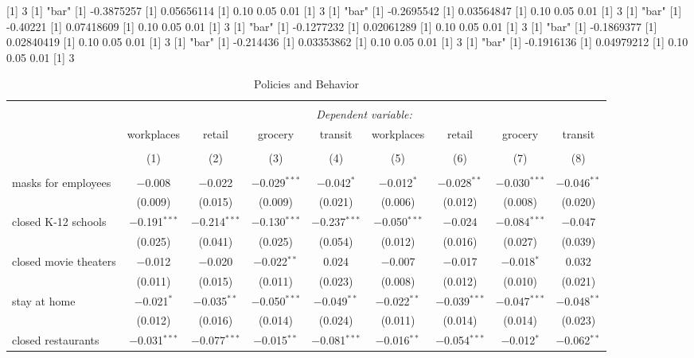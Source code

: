 [1] 3
[1] "bar"
[1] -0.3875257
[1] 0.05656114
[1] 0.10 0.05 0.01
[1] 3
[1] "bar"
[1] -0.2695542
[1] 0.03564847
[1] 0.10 0.05 0.01
[1] 3
[1] "bar"
[1] -0.40221
[1] 0.07418609
[1] 0.10 0.05 0.01
[1] 3
[1] "bar"
[1] -0.1277232
[1] 0.02061289
[1] 0.10 0.05 0.01
[1] 3
[1] "bar"
[1] -0.1869377
[1] 0.02840419
[1] 0.10 0.05 0.01
[1] 3
[1] "bar"
[1] -0.214436
[1] 0.03353862
[1] 0.10 0.05 0.01
[1] 3
[1] "bar"
[1] -0.1916136
[1] 0.04979212
[1] 0.10 0.05 0.01
[1] 3

\begin{table}[!htbp] \centering 
  \caption{Policies and Behavior} 
  \label{} 
\begin{tabular}{@{\extracolsep{1pt}}lcccccccc} 
\\[-1.8ex]\hline 
\hline \\[-1.8ex] 
 & \multicolumn{8}{c}{\textit{Dependent variable:}} \\ 
\cline{2-9} 
 & workplaces & retail & grocery & transit & workplaces & retail & grocery & transit \\ 
\\[-1.8ex] & (1) & (2) & (3) & (4) & (5) & (6) & (7) & (8)\\ 
\hline \\[-1.8ex] 
 masks for employees & $-$0.008 & $-$0.022 & $-$0.029$^{***}$ & $-$0.042$^{*}$ & $-$0.012$^{*}$ & $-$0.028$^{**}$ & $-$0.030$^{***}$ & $-$0.046$^{**}$ \\ 
  & (0.009) & (0.015) & (0.009) & (0.021) & (0.006) & (0.012) & (0.008) & (0.020) \\ 
  closed K-12 schools & $-$0.191$^{***}$ & $-$0.214$^{***}$ & $-$0.130$^{***}$ & $-$0.237$^{***}$ & $-$0.050$^{***}$ & $-$0.024 & $-$0.084$^{***}$ & $-$0.047 \\ 
  & (0.025) & (0.041) & (0.025) & (0.054) & (0.012) & (0.016) & (0.027) & (0.039) \\ 
  closed movie theaters & $-$0.012 & $-$0.020 & $-$0.022$^{**}$ & 0.024 & $-$0.007 & $-$0.017 & $-$0.018$^{*}$ & 0.032 \\ 
  & (0.011) & (0.015) & (0.011) & (0.023) & (0.008) & (0.012) & (0.010) & (0.021) \\ 
  stay at home & $-$0.021$^{*}$ & $-$0.035$^{**}$ & $-$0.050$^{***}$ & $-$0.049$^{**}$ & $-$0.022$^{**}$ & $-$0.039$^{***}$ & $-$0.047$^{***}$ & $-$0.048$^{**}$ \\ 
  & (0.012) & (0.016) & (0.014) & (0.024) & (0.011) & (0.014) & (0.014) & (0.023) \\ 
  closed restaurants & $-$0.031$^{***}$ & $-$0.077$^{***}$ & $-$0.015$^{**}$ & $-$0.081$^{***}$ & $-$0.016$^{**}$ & $-$0.054$^{***}$ & $-$0.012$^{*}$ & $-$0.062$^{**}$ \\ 

\end{tabular}
\end{table}

